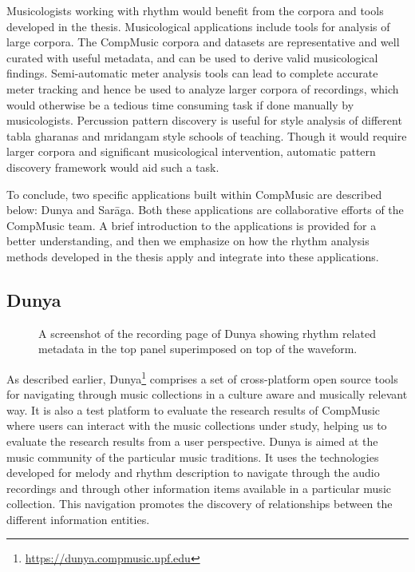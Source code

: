 Musicologists working with rhythm would benefit from the corpora and tools developed in the thesis. Musicological applications include tools for analysis of large corpora. The CompMusic corpora and datasets are representative and well curated with useful metadata, and can be used to derive valid musicological findings. Semi-automatic meter analysis tools can lead to complete accurate meter tracking and hence be used to analyze larger corpora of recordings, which would otherwise be a tedious time consuming task if done manually by musicologists. Percussion pattern discovery is useful for style analysis of different \gls{tabla} \glspl{gharana} and mridangam style schools of teaching. Though it would require larger corpora and significant musicological intervention, automatic pattern discovery framework would aid such a task.

To conclude, two specific applications built within CompMusic are described below: Dunya and Sar\={a}ga. Both these applications are collaborative efforts of the CompMusic team. A brief introduction to the applications is provided for a better understanding, and then we emphasize on how the rhythm analysis methods developed in the thesis apply and integrate into these applications. 
\subsection{Dunya}
\begin{figure}
\centering
{%
\setlength{\fboxsep}{0pt}%
\setlength{\fboxrule}{0.5pt}%
%
}%
\caption[A screenshot of the recording page of Dunya]{A screenshot of the recording page of Dunya showing rhythm related metadata in the top panel superimposed on top of the waveform.}\label{fig:dunya:recpage}
\end{figure}
As described earlier, Dunya\footnote{\url{https://dunya.compmusic.upf.edu}} comprises a set of cross-platform open source tools for navigating through music collections in a culture aware and musically relevant way. It is also a test platform to evaluate the research results of CompMusic where users can interact with the music collections under study, helping us to evaluate the research results from a user perspective. Dunya is aimed at the music community of the particular music traditions. It uses the technologies developed for melody and rhythm description to navigate through the audio recordings and through other information items available in a particular music collection. This navigation promotes the discovery of relationships between the different information entities. 

